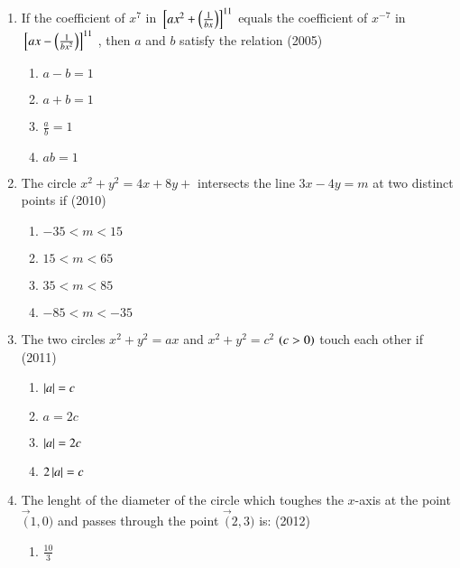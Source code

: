\documentclass[journal,12pt,twocolumn]{IEEEtran}
\theoremstyle{remark}
\begin{document}
\begin{enumerate}
    \item If the coefficient of $x^{7}$ in ${}\left[ax^{2}+\left(\frac{1}{bx}\right)\right]^{11}$ equals the coefficient of $x^{-7}$ in ${}\left[ax-\left(\frac{1}{bx^2}\right)\right]^{11}$  , then $a$ and $b$ satisfy the relation
       \hfill(2005)
     \begin{enumerate}
        \item $a-b=1$\\
        \item $a+b=1$\\
        \item$\frac{a}{b}=1$\\
        \item $ab=1$\\
    \end{enumerate}
    \item The circle $x^2+y^2=4x+8y+$ intersects the line $3x-4y=m$ at two distinct points if
        \hfill(2010)
    \begin{enumerate}
            \item $-35<m<15$\\
            \item $15<m<65$\\
            \item $35<m<85$\\
            \item $-85<m<-35$\\
        \end{enumerate}
    \item The two circles $x^2+y^2=ax$ and $x^2+y^2=c^2$ $\left(c>0\right)$ touch each other if
           \hfill(2011)
    \begin{enumerate}
        \item $\left\vert a\right\vert=c$\\
        \item  $a=2c$\\
        \item $\left\vert a\right\vert=2c$\\
        \item $2\left\vert a\right\vert=c$\\
    \end{enumerate}
    \item The lenght of the diameter of the circle which toughes the $x$-axis at the point $\vec(1,0)$ and passes through the point $\vec(2,3)$ is:
        \hfill(2012)
    \begin{enumerate}
        \item$\frac{10}{3}$\\

\end{enumerate}
\end{enumerate}
\end{document}
